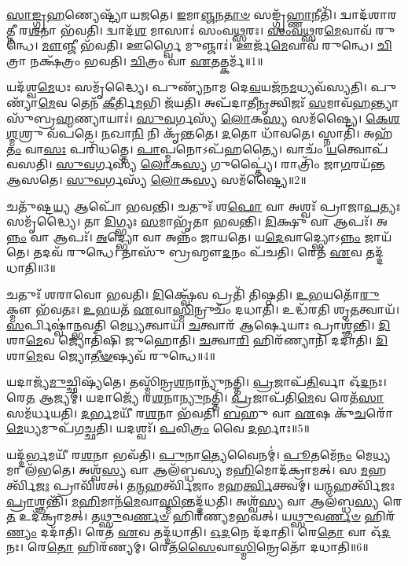 \-\ul{𑌸𑌾}\-\-\ul{𑌙𑍍𑌗𑍍𑌰}\-\-\ul{𑌹}\-𑌣𑍍𑌯𑍇𑌷𑍍𑌟𑍍𑌯𑌾᳴ 𑌯𑌜𑌤𑍇।
\-\ul{𑌇}\-𑌮𑌾\-\ul{𑌞𑍍𑌜}\-𑌨\-\ul{𑌤𑌾}\-\-\ul{𑍞} 𑌸𑌙𑍍𑌗𑍃᳴\-\ul{𑌹𑍍𑌣𑌾}\-𑌨𑍀𑌤𑌿᳴।
𑌦𑍍𑌵𑌾𑌦᳴𑌶𑌾𑌰𑌤𑍍𑌨𑍀 𑌰\-\ul{𑌶}\-𑌨𑌾 𑌭᳴𑌵𑌤𑌿।
𑌦𑍍𑌵𑌾𑌦᳴\-\ul{𑌶} 𑌮𑌾𑌸𑌾𑌃॑ 𑌸𑌂𑌵\-\ul{𑌥𑍍𑌸}\-𑌰𑌃।
\-\ul{𑌸𑌂}\-\-\ul{𑌵}\-\-\ul{𑌥𑍍𑌸}\-𑌰\-\ul{𑌮𑍇}\-𑌵𑌾𑌵᳴ 𑌰𑍁𑌨𑍍𑌧𑍇।
\-\ul{𑌮𑍗}\-𑌞𑍍𑌜𑍀 𑌭᳴𑌵𑌤𑌿।
𑌊𑌰𑍍𑌗𑍍𑌵𑍈 𑌮𑍁𑌞𑍍𑌜𑌾𑌃॑।
𑌊𑌰𑍍𑌜᳴\-\-\ul{𑌮𑍇}\-𑌵𑌾𑌵᳴ 𑌰𑍁𑌨𑍍𑌧𑍇।
\-\ul{𑌚𑌿}\-𑌤𑍍𑌰𑌾 𑌨𑌕𑍍𑌷᳴𑌤𑍍𑌰𑌂 𑌭𑌵𑌤𑌿।
\-\ul{𑌚𑌿}\-𑌤𑍍𑌰𑌂 𑌵𑌾 \ul{𑌏}\-𑌤𑌤𑍍𑌕𑌰𑍍𑌮᳴॥1॥

𑌯𑌦᳴𑌶𑍍𑌵\-\ul{𑌮𑍇}\-𑌧𑌃 𑌸𑌮𑍃᳴𑌦𑍍𑌧𑍍𑌯𑍈।
𑌪𑍁𑌣𑍍𑌯᳴𑌨𑌾𑌮 𑌦𑍇\-\ul{𑌵}\-𑌯𑌜᳴𑌨\-\ul{𑌮}\-𑌧𑍍𑌯𑌵᳴𑌸𑍍𑌯𑌤𑌿।
𑌪𑍁𑌣𑍍𑌯𑌾᳴\-\ul{𑌮𑍇}\-𑌵 𑌤𑍇𑌨᳴ \ul{𑌕𑍀}\-𑌰𑍍𑌤𑌿\-\ul{𑌮}\-𑌭𑌿 𑌜᳴𑌯𑌤𑌿।
𑌅𑌪᳴𑌦𑌾𑌤𑍀\-\ul{𑌨𑍃}\-𑌤𑍍𑌵𑌿𑌜𑌃᳴ \ul{𑌸}\-𑌮𑌾𑌵᳴\-\ul{𑌹}\-𑌨𑍍𑌤𑍍𑌯𑌾 𑌸𑍁᳴𑌬𑍍𑌰\-\ul{𑌹𑍍𑌮}\-𑌣𑍍𑌯𑌾𑌯𑌾𑌃॑।
\-\ul{𑌸𑍁}\-\-\ul{𑌵}\-𑌰𑍍𑌗𑌸𑍍𑌯᳴ \ul{𑌲𑍋}\-𑌕\-\ul{𑌸𑍍𑌯} 𑌸𑌮᳴𑌷𑍍𑌟𑍍𑌯𑍈।
\-\ul{𑌕𑍇}\-\-\ul{𑌶}\-\-\ul{𑌶𑍍𑌮}\-𑌶𑍍𑌰𑍁 𑌵᳴𑌪𑌤𑍇।
\-\ul{𑌨}\-𑌖𑌾\-\ul{𑌨𑌿} 𑌨𑌿 𑌕𑍃᳴𑌨𑍍𑌤𑌤𑍇।
\-\ul{𑌦}\-𑌤𑍋 𑌧𑌾᳴𑌵𑌤𑍇।
𑌸𑍍𑌨𑌾𑌤𑌿᳴।
𑌅𑌹᳴\-\ul{𑌤𑌂} 𑌵𑌾\-\ul{𑌸𑌃} 𑌪𑌰𑌿᳴𑌧𑌤𑍍𑌤𑍇।
\-\ul{𑌪𑌾}\-𑌪𑍍𑌮𑌨𑍋\-𑌽𑌪᳴𑌹𑌤𑍍𑌯𑍈।
𑌵𑌾𑌚𑌂᳴ \ul{𑌯}\-𑌤𑍍𑌵𑍋𑌪᳴ 𑌵𑌸𑌤𑌿।
\-\ul{𑌸𑍁}\-\-\ul{𑌵}\-𑌰𑍍𑌗𑌸𑍍𑌯᳴ \ul{𑌲𑍋}\-𑌕\-\ul{𑌸𑍍𑌯} 𑌗𑍁𑌪𑍍𑌤𑍍𑌯𑍈॑।
𑌰𑌾𑌤𑍍𑌰𑌿𑌂᳴ 𑌜𑌾\-\ul{𑌗}\-𑌰𑌯᳴𑌨𑍍𑌤 𑌆𑌸𑌤𑍇।
\-\ul{𑌸𑍁}\-\-\ul{𑌵}\-𑌰𑍍𑌗𑌸𑍍𑌯᳴ \ul{𑌲𑍋}\-𑌕\-\ul{𑌸𑍍𑌯} 𑌸𑌮᳴𑌷𑍍𑌟𑍍𑌯𑍈॥2॥\anuvakamend[𑌕𑌰𑍍𑌮᳴ 𑌧\-\ul{𑌤𑍍𑌤𑍇} 𑌪𑌞𑍍𑌚᳴ 𑌚]

𑌚𑌤𑍁᳴𑌷𑍍𑌟\-\ul{𑌯𑍍𑌯} 𑌆𑌪𑍋᳴ 𑌭𑌵𑌨𑍍𑌤𑌿।
𑌚𑌤𑍁𑌃᳴ 𑌶\-\ul{𑌫𑍋} 𑌵𑌾 𑌅𑌶𑍍𑌵𑌃᳴ 𑌪𑍍𑌰𑌾𑌜𑌾\-\ul{𑌪}\-𑌤𑍍𑌯𑌃 𑌸𑌮𑍃᳴𑌦𑍍𑌧𑍍𑌯𑍈।
𑌤𑌾 \ul{𑌦𑌿}\-𑌗𑍍𑌭𑍍𑌯𑌃 \ul{𑌸}\-𑌮𑌾𑌭𑍃᳴𑌤𑌾 𑌭𑌵𑌨𑍍𑌤𑌿।
\-\ul{𑌦𑌿}\-𑌕𑍍𑌷𑍁 𑌵𑌾 𑌆𑌪𑌃᳴।
𑌅\-\ul{𑌨𑍍𑌨𑌂} 𑌵𑌾 𑌆𑌪𑌃᳴।
\-\ul{𑌅}\-𑌦𑍍𑌭𑍍𑌯𑍋 𑌵𑌾 𑌅𑌨𑍍𑌨𑌂᳴ 𑌜𑌾𑌯𑌤𑍇।
𑌯\-\ul{𑌦𑍇}\-𑌵𑌾𑌦𑍍𑌭𑍍𑌯𑍋\-𑌽\-\ul{𑌨𑍍𑌨𑌂} 𑌜𑌾𑌯᳴𑌤𑍇।
𑌤𑌦𑌵᳴ 𑌰𑍁𑌨𑍍𑌧𑍇।
𑌤𑌾𑌸𑍁᳴ 𑌬𑍍𑌰𑌹𑍍𑌮𑍗\-\ul{𑌦}\-𑌨𑌂 𑌪᳴𑌚𑌤𑌿।
𑌰𑍇𑌤᳴ \ul{𑌏}\-𑌵 𑌤𑌦𑍍𑌦᳴𑌧𑌾𑌤𑌿॥3॥

𑌚𑌤𑍁𑌃᳴ 𑌶𑌰𑌾𑌵𑍋 𑌭𑌵𑌤𑌿।
\-\ul{𑌦𑌿}\-𑌕𑍍𑌷𑍍𑌵𑍇᳴𑌵 𑌪𑍍𑌰𑌤𑌿᳴ 𑌤𑌿𑌷𑍍𑌠𑌤𑌿।
\-\ul{𑌉}\-\-\ul{𑌭}\-𑌯𑌤𑍋᳴\-\ul{𑌰𑍁}\-𑌕𑍍𑌮𑍗 𑌭᳴𑌵𑌤𑌃।
\-\ul{𑌉}\-\-\ul{𑌭}\-𑌯𑌤᳴ \ul{𑌏}\-𑌵𑌾\-\ul{𑌸𑍍𑌮𑌿}\-𑌨𑍍𑌰𑍁𑌚𑌂᳴ 𑌦𑌧𑌾𑌤𑌿।
𑌉𑌦𑍍𑌧᳴𑌰𑌤𑌿 𑌶𑍃\-\ul{𑌤}\-𑌤𑍍𑌵𑌾𑌯᳴।
\-\ul{𑌸}\-𑌰𑍍𑌪𑌿𑌷𑍍𑌵𑌾॑𑌨𑍍𑌭𑌵𑌤𑌿 𑌮𑍇\-\ul{𑌧𑍍𑌯}\-𑌤𑍍𑌵𑌾𑌯᳴।
\-\ul{𑌚}\-𑌤𑍍𑌵𑌾𑌰᳴ 𑌆𑌰𑍍\mbox{}\-\ul{𑌷𑍇}\-𑌯𑌾𑌃 𑌪𑍍𑌰𑌾𑌶𑍍𑌞᳴𑌨𑍍𑌤𑌿।
\-\ul{𑌦𑌿}\-𑌶𑌾\-\ul{𑌮𑍇}\-𑌵 𑌜𑍍𑌯𑍋𑌤𑌿᳴𑌷𑌿 𑌜𑍁𑌹𑍋𑌤𑌿।
\-\ul{𑌚}\-𑌤𑍍𑌵𑌾\-\ul{𑌰𑌿} 𑌹𑌿𑌰᳴𑌣𑍍𑌯𑌾𑌨𑌿 𑌦𑌦𑌾𑌤𑌿।
\-\ul{𑌦𑌿}\-𑌶𑌾\-\ul{𑌮𑍇}\-𑌵 𑌜𑍍𑌯𑍋\-\ul{𑌤𑍀}\-\-\ul{𑍟}\-𑌷𑍍𑌯𑌵᳴ 𑌰𑍁𑌨𑍍𑌧𑍇॥4॥

𑌯𑌦𑌾𑌜𑍍𑌯᳴\-\ul{𑌮𑍁}\-𑌚𑍍𑌛𑌿𑌷𑍍𑌯᳴𑌤𑍇।
𑌤𑌸𑍍𑌮𑌿᳴𑌨𑍍𑌰\-\ul{𑌶}\-𑌨𑌾𑌨𑍍𑌯𑍁᳴𑌨𑌤𑍍𑌤𑌿।
\-\ul{𑌪𑍍𑌰}\-𑌜𑌾𑌪᳴\-\ul{𑌤𑌿}\-𑌰𑍍𑌵𑌾 𑌓᳴\-\ul{𑌦}\-𑌨𑌃।
𑌰𑍇\-\ul{𑌤} 𑌆𑌜𑍍𑌯𑌮𑍍॑।
𑌯𑌦𑌾𑌜𑍍𑌯𑍇᳴ 𑌰\-\ul{𑌶}\-𑌨𑌾\-\ul{𑌨𑍍𑌯𑍁}\-𑌨𑌤𑍍𑌤𑌿᳴।
\-\ul{𑌪𑍍𑌰}\-𑌜𑌾𑌪᳴𑌤𑌿\-\ul{𑌮𑍇}\-𑌵 𑌰𑍇𑌤᳴\-\ul{𑌸𑌾} 𑌸𑌮᳴𑌰𑍍𑌧𑌯𑌤𑌿।
\-\ul{𑌦}\-\-\ul{𑌰𑍍𑌭}\-𑌮𑌯𑍀᳴ 𑌰\-\ul{𑌶}\-𑌨𑌾 𑌭᳴𑌵𑌤𑌿।
\-\ul{𑌬}\-𑌹𑍁 𑌵𑌾 \ul{𑌏}\-𑌷 𑌕𑍁᳴\-\ul{𑌚}\-𑌰𑍋᳴ \ul{𑌮𑍇}\-𑌧𑍍𑌯𑌮𑍁𑌪᳴𑌗𑌚𑍍𑌛𑌤𑌿।
𑌯𑌦𑌶𑍍𑌵𑌃᳴।
\-\ul{𑌪}\-𑌵𑌿\-\ul{𑌤𑍍𑌰𑌂} 𑌵𑍈 \ul{𑌦}\-𑌰𑍍𑌭𑌾𑌃॥5॥

𑌯𑌦𑍍𑌦᳴\-\ul{𑌰𑍍𑌭}\-𑌮𑌯𑍀᳴ 𑌰\-\ul{𑌶}\-𑌨𑌾 𑌭𑌵᳴𑌤𑌿।
\-\ul{𑌪𑍁}\-𑌨𑌾\-\ul{𑌤𑍍𑌯𑍇}\-𑌵𑍈𑌨𑌮𑍍॑।
\-\ul{𑌪𑍂}\-𑌤𑌮𑍇᳴\-\ul{𑌨𑌂} 𑌮𑍇\-\ul{𑌧𑍍𑌯}\-𑌮𑌾 𑌲᳴𑌭𑌤𑍇।
𑌅𑌶𑍍𑌵᳴\-\ul{𑌸𑍍𑌯} 𑌵𑌾 𑌆𑌲᳴𑌬𑍍𑌧𑌸𑍍𑌯 𑌮\-\ul{𑌹𑌿}\-𑌮𑍋𑌦᳴𑌕𑍍𑌰𑌾𑌮𑌤𑍍।
𑌸 \ul{𑌮}\-𑌹𑌰𑍍𑌤𑍍𑌵𑌿᳴\-\ul{𑌜𑌃} 𑌪𑍍𑌰𑌾𑌵𑌿᳴𑌶𑌤𑍍।
𑌤\-\ul{𑌨𑍍𑌮}\-𑌹𑌰𑍍𑌤𑍍𑌵𑌿᳴𑌜𑌾𑌂 𑌮𑌹\-\ul{𑌰𑍍𑌤𑍍𑌵𑌿}\-𑌕𑍍𑌤𑍍𑌵𑌮𑍍।
𑌯\-\ul{𑌨𑍍𑌮}\-𑌹𑌰𑍍𑌤𑍍𑌵𑌿᳴𑌜𑌃 \ul{𑌪𑍍𑌰𑌾}\-𑌶𑍍𑌞𑌨𑍍𑌤𑌿᳴।
\-\ul{𑌮}\-\-\ul{𑌹𑌿}\-𑌮𑌾𑌨᳴\-\ul{𑌮𑍇}\-𑌵𑌾\-\ul{𑌸𑍍𑌮𑌿}\-𑌨𑍍𑌤𑌦𑍍𑌦᳴𑌧𑌤𑌿।
𑌅𑌶𑍍𑌵᳴\-\ul{𑌸𑍍𑌯} 𑌵𑌾 𑌆𑌲᳴𑌬𑍍𑌧\-\ul{𑌸𑍍𑌯} 𑌰𑍇\-\ul{𑌤} 𑌉𑌦᳴𑌕𑍍𑌰𑌾𑌮𑌤𑍍।
𑌤\-\ul{𑌥𑍍𑌸𑍁}\-𑌵\-\ul{𑌰𑍍𑌣}\-\-\ul{𑍞} 𑌹𑌿𑌰᳴𑌣𑍍𑌯𑌮𑌭𑌵𑌤𑍍।
𑌯\-\ul{𑌥𑍍𑌸𑍁}\-𑌵\-\ul{𑌰𑍍𑌣}\-\-\ul{𑍞} 𑌹𑌿𑌰᳴\-\ul{𑌣𑍍𑌯𑌂} 𑌦𑌦𑌾᳴𑌤𑌿।
𑌰𑍇𑌤᳴ \ul{𑌏}\-𑌵 𑌤𑌦𑍍𑌦᳴𑌧𑌾𑌤𑌿।
\-\ul{𑌓}\-\-\ul{𑌦}\-𑌨𑍇 𑌦᳴𑌦𑌾𑌤𑌿।
𑌰𑍇\-\ul{𑌤𑍋} 𑌵𑌾 𑌓᳴\-\ul{𑌦}\-𑌨𑌃।
𑌰𑍇\-\ul{𑌤𑍋} 𑌹𑌿𑌰᳴𑌣𑍍𑌯𑌮𑍍।
𑌰𑍇𑌤᳴\-\ul{𑌸𑍈}\-𑌵𑌾\-\ul{𑌸𑍍𑌮𑌿}\-𑌨𑍍𑌰𑍇𑌤𑍋᳴ 𑌦𑌧𑌾𑌤𑌿॥6॥\anuvakamend[\-\ul{𑌦}\-\-\ul{𑌧𑌾}\-\-\ul{𑌤𑌿} \ul{𑌰𑍁}\-\-\ul{𑌨𑍍𑌧𑍇} \ul{𑌦}\-𑌰𑍍𑌭𑌾 𑌅᳴𑌭\-\ul{𑌵}\-𑌥𑍍𑌷𑌟𑍍 𑌚᳴]

